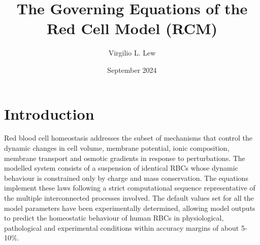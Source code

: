 \documentclass[a4paper]{article}
\title{The Governing Equations of the Red Cell Model (RCM)}
\author{Virgilio L. Lew}
\date{September 2024}
\makeatletter
\renewcommand\maketitle
  {\noindent
   {\Large\bfseries\@title}%
   \medskip\par\noindent
   {\large\bfseries\@author}%
   \hfill
   {\large\@date}%
   \bigskip\par\noindent
  }
\makeatother
\begin{document}
\setcounter{page}{28}

\maketitle

\section{Introduction}\label{introduction}




Red blood cell homeostasis addresses the subset of mechanisms that control the dynamic changes in cell volume, membrane potential, ionic composition, membrane transport and osmotic gradients in response to perturbations. The modelled system consists of a suspension of identical RBCs whose dynamic behaviour is constrained only by charge and mass conservation. The equations implement these laws following a strict computational sequence representative of the multiple interconnected processes involved. The default values set for all the model parameters have been experimentally determined, allowing model outputs to predict the homeostatic behaviour of human RBCs in physiological, pathological and experimental conditions within accuracy margins of about 5-10\%.  
\end{document}
